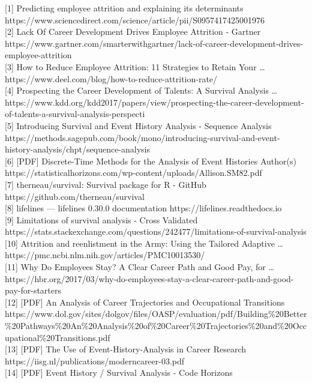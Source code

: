 \documentclass[./main.tex]{subfiles}
\begin{document}
{[}1{]} Predicting employee attrition and explaining its determinants
https://www.sciencedirect.com/science/article/pii/S0957417425001976\\
{[}2{]} Lack Of Career Development Drives Employee Attrition - Gartner
https://www.gartner.com/smarterwithgartner/lack-of-career-development-drives-employee-attrition\\
{[}3{]} How to Reduce Employee Attrition: 11 Strategies to Retain Your
\ldots{} https://www.deel.com/blog/how-to-reduce-attrition-rate/\\
{[}4{]} Prospecting the Career Development of Talents: A Survival
Analysis \ldots{}
https://www.kdd.org/kdd2017/papers/view/prospecting-the-career-development-of-talents-a-survival-analysis-perspecti\\
{[}5{]} Introducing Survival and Event History Analysis - Sequence
Analysis
https://methods.sagepub.com/book/mono/introducing-survival-and-event-history-analysis/chpt/sequence-analysis\\
{[}6{]} {[}PDF{]} Discrete-Time Methods for the Analysis of Event
Histories Author(s)
https://statisticalhorizons.com/wp-content/uploads/Allison.SM82.pdf\\
{[}7{]} therneau/survival: Survival package for R - GitHub
https://github.com/therneau/survival\\
{[}8{]} lifelines --- lifelines 0.30.0 documentation
https://lifelines.readthedocs.io\\
{[}9{]} Limitations of survival analysis - Cross Validated
https://stats.stackexchange.com/questions/242477/limitations-of-survival-analysis\\
{[}10{]} Attrition and reenlistment in the Army: Using the Tailored
Adaptive \ldots{} https://pmc.ncbi.nlm.nih.gov/articles/PMC10013530/\\
{[}11{]} Why Do Employees Stay? A Clear Career Path and Good Pay, for
\ldots{}
https://hbr.org/2017/03/why-do-employees-stay-a-clear-career-path-and-good-pay-for-starters\\
{[}12{]} {[}PDF{]} An Analysis of Career Trajectories and Occupational
Transitions
https://www.dol.gov/sites/dolgov/files/OASP/evaluation/pdf/Building\%20Better\%20Pathways\%20An\%20Analysis\%20of\%20Career\%20Trajectories\%20and\%20Occupational\%20Transitions.pdf\\
{[}13{]} {[}PDF{]} The Use of Event-History-Analysis in Career Research
https://iisg.nl/publications/moderncareer-03.pdf\\
{[}14{]} {[}PDF{]} Event History / Survival Analysis - Code Horizons
\end{document}
